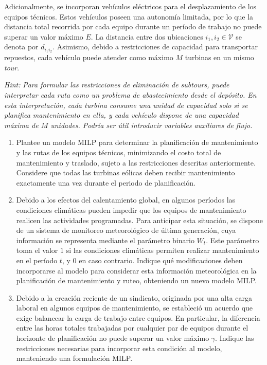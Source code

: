 Adicionalmente, se incorporan vehículos eléctricos para el desplazamiento de los equipos técnicos. Estos vehículos poseen una autonomía limitada, por lo que la distancia total recorrida por cada equipo durante un período de trabajo no puede superar un valor máximo $E$. La distancia entre dos ubicaciones $i_1,i_2\in\mathcal{V}$ se denota por $d_{i_1i_2}$. Asimismo, debido a restricciones de capacidad para transportar repuestos, cada vehículo puede atender como máximo $M$ turbinas en un mismo \textit{tour}.


\textit{Hint:} \textit{Para formular las restricciones de eliminación de subtours, puede interpretar cada ruta como un problema de abastecimiento desde el depósito. En esta interpretación, cada turbina consume una unidad de capacidad solo si se planifica mantenimiento en ella, y cada vehículo dispone de una capacidad máxima de $M$ unidades. Podría ser útil introducir  variables auxiliares de flujo.}

 
\begin{enumerate}
    \item Plantee un modelo MILP para determinar la planificación de mantenimiento y las rutas de los equipos técnicos, minimizando el costo total de mantenimiento y traslado, sujeto a las restricciones descritas anteriormente. Considere que todas las turbinas eólicas deben recibir mantenimiento exactamente una vez durante el periodo de planificación.  
    
    \item Debido a los efectos del calentamiento global, en algunos períodos las condiciones climáticas pueden impedir que los equipos de mantenimiento realicen las actividades programadas. Para anticipar esta situación, se dispone de un sistema de monitoreo meteorológico de última generación, cuya información se representa mediante el parámetro binario $W_t$. Este parámetro toma el valor $1$ si las condiciones climáticas permiten realizar mantenimiento en el período $t$, y $0$ en caso contrario. Indique qué modificaciones deben incorporarse al modelo para considerar esta información meteorológica en la planificación de mantenimiento y ruteo, obteniendo un nuevo modelo MILP.
    
    \item Debido a la creación reciente de un sindicato, originada por una alta carga laboral en algunos equipos de mantenimiento, se estableció un acuerdo que exige balancear la carga de trabajo entre equipos. En particular, la diferencia entre las horas totales trabajadas por cualquier par de equipos durante el horizonte de planificación no puede superar un valor máximo $\gamma$. Indique las restricciones necesarias para incorporar esta condición al modelo, manteniendo una formulación MILP.
\end{enumerate}
